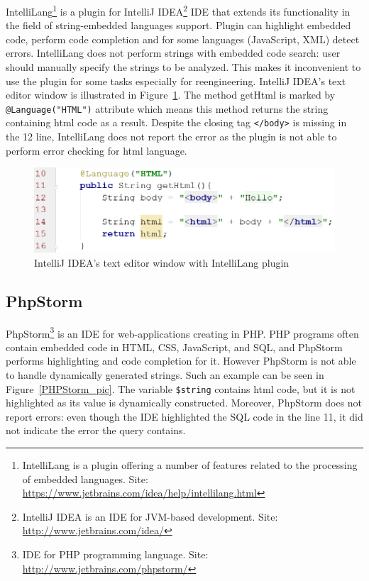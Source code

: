 IntelliLang\footnote{IntelliLang is a plugin offering a number of features related to the processing of embedded languages. Site: \url{https://www.jetbrains.com/idea/help/intellilang.html}} is a plugin for  IntelliJ IDEA\footnote{IntelliJ IDEA is an IDE for JVM-based development. Site: \url{http://www.jetbrains.com/idea/}} IDE that extends its functionality in the field of string-embedded languages support. Plugin can highlight embedded code, perform code completion and for some languages (JavaScript, XML) detect errors. IntelliLang does not perform strings with embedded code search: user should manually specify the strings to be analyzed. This makes it inconvenient to use the plugin for some tasks especially for reengineering. IntelliJ IDEA's text editor window is illustrated in Figure~\ref{IntelliLang_pic}. The method getHtml is marked by \verb|@Language("HTML")| attribute which means this method returns the string containing html code as a result. Despite the closing tag \verb|</body>| is missing in the 12 line, IntelliLang does not report the error as the plugin is not able to perform error checking for html language.

\begin{figure}[h!]
    \begin{center}
        \includegraphics[scale=0.35]{Figures/IntelliLang.PNG}
    \end{center}
    \caption{IntelliJ IDEA's text editor window with IntelliLang plugin}
    \label{IntelliLang_pic}
\end{figure} 

\subsection{PhpStorm}

PhpStorm\footnote{IDE for PHP programming language. Site: \url{http://www.jetbrains.com/phpstorm/}} is an IDE for web-applications creating in PHP. PHP programs often contain embedded code in HTML, CSS, JavaScript, and SQL, and PhpStorm performs highlighting and code completion for it. However PhpStorm is not able to handle dynamically generated strings. Such an example can be seen in Figure~\ref{PHPStorm_pic}. The variable \verb|$string| contains html code, but it is not highlighted as its value is dynamically constructed. Moreover, PhpStorm does not report errors: even though the IDE highlighted the SQL code in the line 11, it did not indicate the error the query contains.

